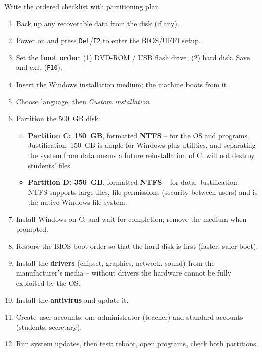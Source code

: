 \documentclass[11pt]{article}
\begin{document}
\begin{exoresolu}
Write the ordered checklist with partitioning plan.
\tcblower
\begin{enumerate}
\item Back up any recoverable data from the disk (if any).
\item Power on and press \texttt{Del}/\texttt{F2} to enter the BIOS/UEFI setup.
\item Set the \textbf{boot order}: (1) DVD-ROM / USB flash drive, (2) hard disk. Save and exit (\texttt{F10}).
\item Insert the Windows installation medium; the machine boots from it.
\item Choose language, then \emph{Custom installation}.
\item Partition the 500~GB disk:
\begin{itemize}
\item \textbf{Partition C: 150~GB}, formatted \textbf{NTFS} -- for the OS and programs. Justification: 150~GB is ample for Windows plus utilities, and separating the system from data means a future reinstallation of C: will not destroy students' files.
\item \textbf{Partition D: 350~GB}, formatted \textbf{NTFS} -- for data. Justification: NTFS supports large files, file permissions (security between users) and is the native Windows file system.
\end{itemize}
\item Install Windows on C: and wait for completion; remove the medium when prompted.
\item Restore the BIOS boot order so that the hard disk is first (faster, safer boot).
\item Install the \textbf{drivers} (chipset, graphics, network, sound) from the manufacturer's media -- without drivers the hardware cannot be fully exploited by the OS.
\item Install the \textbf{antivirus} and update it.
\item Create user accounts: one administrator (teacher) and standard accounts (students, secretary).
\item Run system updates, then test: reboot, open programs, check both partitions.
\end{enumerate}
\end{exoresolu}
\end{document}
